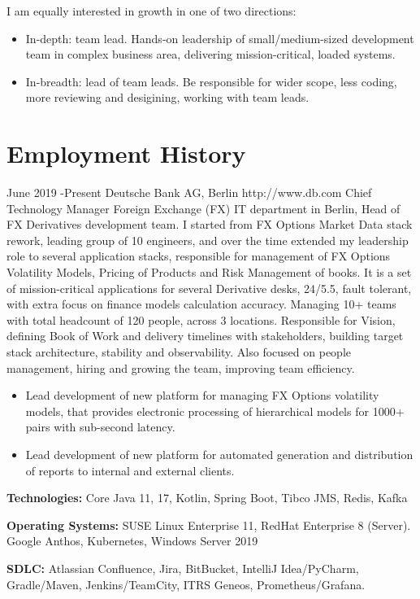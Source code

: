 \documentclass[10pt]{article} %
\begin{document}
I am equally interested in growth in one of two directions:
{\begin{itemize}
\item{In-depth: team lead. Hands-on leadership of small/medium-sized development team in complex business area, 
delivering mission-critical, loaded systems.}
\item{In-breadth: lead of team leads. Be responsible for wider scope, less coding, more reviewing and desigining,
 working with team leads.}
\end{itemize}}


\section{Employment History}

\job
{June 2019 -}{Present}
{Deutsche Bank AG, Berlin}
{http://www.db.com}
{Chief Technology Manager}
{Foreign Exchange (FX) IT department in Berlin, Head of FX Derivatives development team.
I started from FX Options Market Data stack rework, leading group of 10 engineers, and over the time extended my leadership role
to several application stacks, responsible for management of FX Options Volatility Models, Pricing of Products and Risk Management of books.
It is a set of mission-critical applications for several Derivative desks, 24/5.5, fault tolerant, with extra focus on finance models calculation accuracy.
Managing 10+ teams with total headcount of 120 people, across 3 locations. Responsible for Vision, defining Book of Work and delivery timelines
with stakeholders, building target stack architecture, stability and observability. Also focused on people management, hiring and growing the team,
improving team efficiency.}
{\begin{itemize}
\item{Lead development of new platform for managing FX Options volatility models, that provides electronic processing of hierarchical models
for 1000+ pairs with sub-second latency.}
\item{Lead development of new platform for automated generation and distribution of reports to internal and external clients.}
\end{itemize}}
{\rule{0mm}{5mm}\textbf{Technologies:} Core Java 11, 17, Kotlin, Spring Boot, Tibco JMS, Redis, Kafka\\
\rule{0mm}{5mm}\textbf{Operating Systems:} SUSE Linux Enterprise 11, RedHat Enterprise 8 (Server). Google Anthos,
Kubernetes, Windows Server 2019\\
\rule{0mm}{5mm}\textbf{SDLC:} Atlassian Confluence, Jira, BitBucket, IntelliJ Idea/PyCharm, Gradle/Maven, Jenkins/TeamCity,  
ITRS Geneos, Prometheus/Grafana.
}
\end{document}
